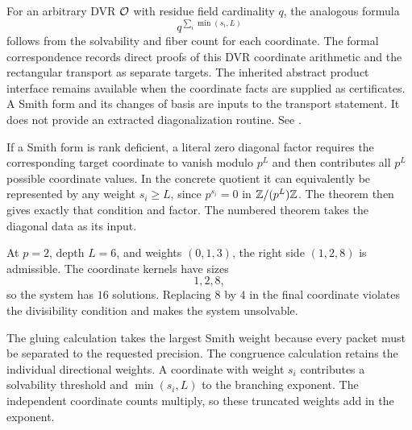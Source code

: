 For an arbitrary DVR ${\mathcal O}$ with residue field cardinality $q$, the analogous
formula
\[
q^{\sum_i\min(s_i,L)}
\]
follows from the solvability and fiber count for each coordinate. The formal
correspondence records direct proofs of this DVR coordinate arithmetic and
the rectangular transport as separate targets.
The inherited abstract product interface remains available when the coordinate
facts are supplied as certificates. A Smith form and its changes of basis are
inputs to the transport statement. It does not provide an extracted
diagonalization routine. See \cite{Serre1979,Lang2002}.

If a Smith form is rank deficient, a literal zero diagonal factor requires
the corresponding target coordinate to vanish modulo $p^L$ and then
contributes all $p^L$ possible coordinate values. In the concrete quotient it
can equivalently be represented by any weight $s_i\ge L$, since
$p^{s_i}=0$ in $\mathbb Z/(p^L)\mathbb Z$. The theorem then gives exactly that condition and
factor. The numbered theorem takes the diagonal data as its input.

\begin{example}
At $p=2$, depth $L=6$, and weights $(0,1,3)$, the right side $(1,2,8)$ is admissible. The coordinate kernels have sizes
\[
1,2,8,
\]
so the system has $16$ solutions. Replacing $8$ by $4$ in the final coordinate violates the divisibility condition and makes the system unsolvable.
\end{example}

\begin{interpretation}
The gluing calculation takes the largest Smith weight because every packet must be separated to the requested precision. The congruence calculation retains the individual directional weights. A coordinate with weight $s_i$ contributes a solvability threshold and $\min(s_i,L)$ to the branching exponent. The independent coordinate counts multiply, so these truncated weights add in the exponent.
\end{interpretation}


